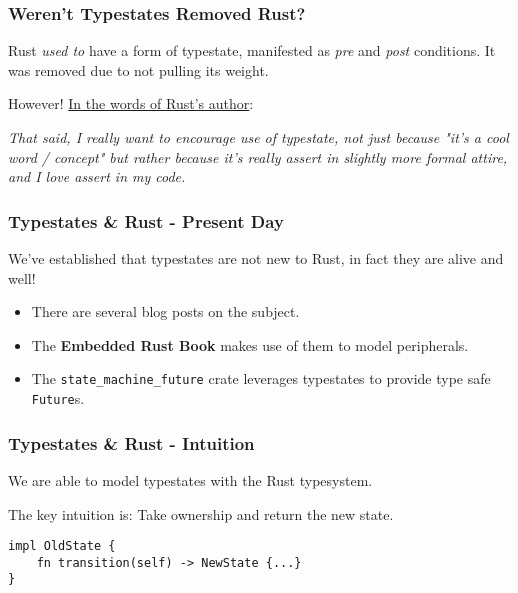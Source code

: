 \documentclass[notes]{beamer}
\begin{document}
\begin{frame}
    \frametitle{Weren't Typestates Removed Rust?}

    Rust \textit{used to} have a form of typestate, manifested as \textit{pre} and \textit{post} conditions.
    It was removed due to not pulling its weight.

    However! \href{https://github.com/rust-lang/rust/issues/1805\#issuecomment-3951241}{In the words of Rust's author}:

    \alert{\textit{That said, I really want to encourage use of typestate, not just because "it's a cool word / concept" but rather because it's really assert in slightly more formal attire, and I love assert in my code.}}

\end{frame}

\begin{frame}
    \frametitle{Typestates \& Rust - Present Day}

    We've established that typestates are not new to Rust,
    in fact they are alive and well!
    \begin{itemize}
        \item There are several blog posts on the subject.
        \item The \textbf{Embedded Rust Book} makes use of them to model peripherals.
        \item The \texttt{state\_machine\_future} crate leverages typestates to provide type safe \texttt{Future}s.
    \end{itemize}

\end{frame}

\begin{frame}[fragile]
    \frametitle{Typestates \& Rust - Intuition}

    We are able to model typestates with the Rust typesystem.

    The key intuition is:
    \alert{Take ownership and return the new state.}

    \begin{lstlisting}
impl OldState {
    fn transition(self) -> NewState {...}
}
    \end{lstlisting}

\end{frame}
\end{document}
